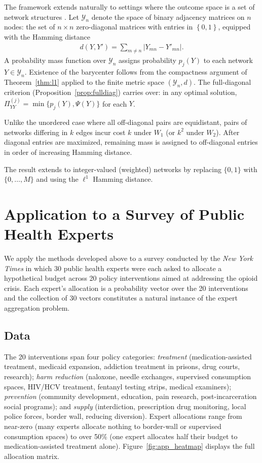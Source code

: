 The framework extends naturally to settings where the outcome space is a set of network structures \cite{danielson18}.  Let $\mathcal{Y}_n$ denote the space of binary adjacency matrices on $n$ nodes: the set of $n\times n$ zero-diagonal matrices with entries in $\left\{0,1\right\}$, equipped with the Hamming distance
\begin{align*}
d(Y,Y')=\sum_{m\neq n}\left|Y_{mn}-Y'_{mn}\right|.
\end{align*}
A probability mass function over $\mathcal{Y}_n$ assigns probability $p_j(Y)$ to each network $Y\in\mathcal{Y}_n$.  Existence of the barycenter follows from the compactness argument of Theorem~\ref{thm:l1} applied to the finite metric space $(\mathcal{Y}_n, d)$.  The full-diagonal criterion (Proposition~\ref{prop:fulldiag}) carries over: in any optimal solution, $\Pi^{(j)}_{YY}=\min\{p_j(Y),\Psi(Y)\}$ for each $Y$.

Unlike the unordered case where all off-diagonal pairs are equidistant, pairs of networks differing in $k$ edges incur cost $k$ under $W_1$ (or $k^2$ under $W_2$).  After diagonal entries are maximized, remaining mass is assigned to off-diagonal entries in order of increasing Hamming distance.

The result extends to integer-valued (weighted) networks by replacing $\{0,1\}$ with $\{0,\ldots,M\}$ and using the $\ell^1$ Hamming distance.

\section{Application to a Survey of Public Health Experts}
\label{app:opioid}

We apply the methods developed above to a survey conducted by the \textit{New York Times} in which 30 public health experts were each asked to allocate a hypothetical budget across 20 policy interventions aimed at addressing the opioid crisis.  Each expert's allocation is a probability vector over the 20 interventions and the collection of 30 vectors constitutes a natural instance of the expert aggregation problem.

\subsection{Data}

The 20 interventions span four policy categories: \emph{treatment} (medication-assisted treatment, medicaid expansion, addiction treatment in prisons, drug courts, research); \emph{harm reduction} (naloxone, needle exchanges, supervised consumption spaces, HIV/HCV treatment, fentanyl testing strips, medical examiners); \emph{prevention} (community development, education, pain research, post-incarceration social programs); and \emph{supply} (interdiction, prescription drug monitoring, local police forces, border wall, reducing diversion).  Expert allocations range from near-zero (many experts allocate nothing to border-wall or supervised consumption spaces) to over 50\% (one expert allocates half their budget to medication-assisted treatment alone).  Figure~\ref{fig:app_heatmap} displays the full allocation matrix.

